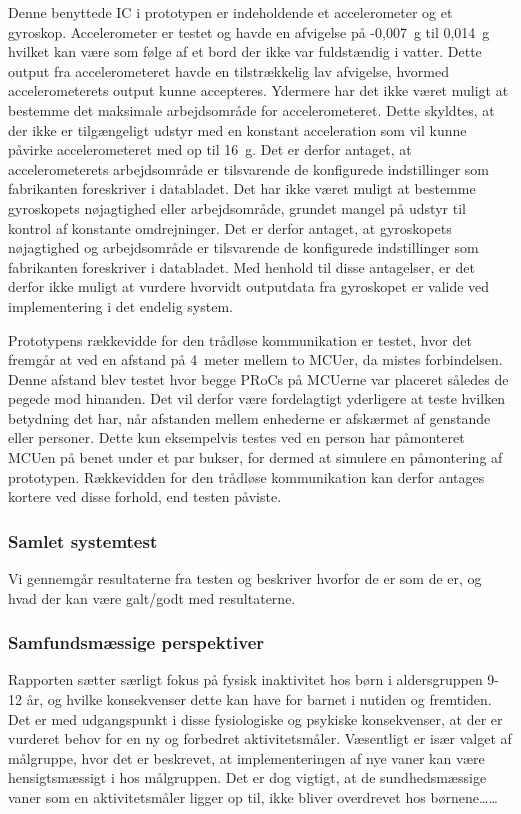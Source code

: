 Denne benyttede IC i prototypen er indeholdende et accelerometer og et gyroskop. Accelerometer er testet og havde en afvigelse på -0,007~g til 0,014~g hvilket kan være som følge af et bord der ikke var fuldstændig i vatter. Dette output fra accelerometeret havde en tilstrækkelig lav afvigelse, hvormed accelerometerets output kunne accepteres. Ydermere har det ikke været muligt at bestemme det maksimale arbejdsområde for accelerometeret. Dette skyldtes, at der ikke er tilgængeligt udstyr med en konstant acceleration som vil kunne påvirke accelerometeret med op til 16~g. Det er derfor antaget, at accelerometerets arbejdsområde er tilsvarende de konfigurede indstillinger som fabrikanten foreskriver i databladet. Det har ikke været muligt at bestemme gyroskopets nøjagtighed eller arbejdsområde, grundet mangel på udstyr til kontrol af konstante omdrejninger. Det er derfor antaget, at gyroskopets nøjagtighed og arbejdsområde er tilsvarende de konfigurede indstillinger som fabrikanten foreskriver i databladet. Med henhold til disse antagelser, er det derfor ikke muligt at vurdere hvorvidt outputdata fra gyroskopet er valide ved implementering i det endelig system. 

Prototypens rækkevidde for den trådløse kommunikation er testet, hvor det fremgår at ved en afstand på 4~meter mellem to MCUer, da mistes forbindelsen. Denne afstand blev testet hvor begge PRoCs på MCUerne var placeret således de pegede mod hinanden. Det vil derfor være fordelagtigt yderligere at teste hvilken betydning det har, når afstanden mellem enhederne er afskærmet af genstande eller personer. Dette kun eksempelvis testes ved en person har påmonteret MCUen på benet under et par bukser, for dermed at simulere en påmontering af prototypen. Rækkevidden for den trådløse kommunikation kan derfor antages kortere ved disse forhold, end testen påviste.


\subsubsection{Samlet systemtest}
Vi gennemgår resultaterne fra testen og beskriver hvorfor de er som de er, og hvad der kan være galt/godt med resultaterne.


\subsubsection{Samfundsmæssige perspektiver}
Rapporten sætter særligt fokus på fysisk inaktivitet hos børn i aldersgruppen 9-12 år, og hvilke konsekvenser dette kan have for barnet i nutiden og fremtiden. Det er med udgangspunkt i disse fysiologiske og psykiske konsekvenser, at der er vurderet behov for en ny og forbedret aktivitetsmåler. Væsentligt er især valget af målgruppe, hvor det er beskrevet, at implementeringen af nye vaner kan være hensigtsmæssigt i hos målgruppen. Det er dog vigtigt, at de sundhedsmæssige vaner som en aktivitetsmåler ligger op til, ikke bliver overdrevet hos børnene……
